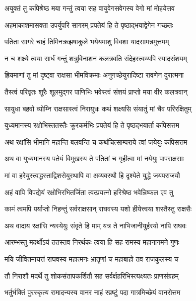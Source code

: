 \twolineshloka
{अयुक्तं तु कपिश्रेष्ठ मया गन्तुं त्वया सह}
{वायुवेगसवेगस्य वेगो मां मोहयेत्तव} %

\twolineshloka
{अहमाकाशमासक्ता उपर्युपरि सागरम्}
{प्रपतेयं हि ते पृष्ठाद्भयाद्वेगेन गच्छतः} %

\twolineshloka
{पतिता सागरे चाहं तिमिनक्रझषाकुले}
{भयेयमाशु विवशा यादसामन्नमुत्तमम्} %

\twolineshloka
{न च शक्ष्ये त्वया सार्धं गन्तुं शत्रुविनाशन}
{कलत्रवति संदेहस्त्वय्यपि स्यादसंशयम्} %

\twolineshloka
{ह्रियमाणां तु मां दृष्ट्वा राक्षसा भीमविक्रमाः}
{अनुगच्छेयुरादिष्टा रावणेन दुरात्मना} %

\twolineshloka
{तैस्त्वं परिवृतः शूरैः शूलमुद्गर पाणिभिः}
{भवेस्त्वं संशयं प्राप्तो मया वीर कलत्रवान्} %

\twolineshloka
{सायुधा बहवो व्योम्नि राक्षसास्त्वं निरायुधः}
{कथं शक्ष्यसि संयातुं मां चैव परिरक्षितुम्} %

\twolineshloka
{युध्यमानस्य रक्षोभिस्ततस्तैः क्रूरकर्मभिः}
{प्रपतेयं हि ते पृष्ठद्भयार्ता कपिसत्तम} %

\twolineshloka
{अथ रक्षांसि भीमानि महान्ति बलवन्ति च}
{कथंचित्साम्पराये त्वां जयेयुः कपिसत्तम} %

\twolineshloka
{अथ वा युध्यमानस्य पतेयं विमुखस्य ते}
{पतितां च गृहीत्वा मां नयेयुः पापराक्षसाः} %

\twolineshloka
{मां वा हरेयुस्त्वद्धस्ताद्विशसेयुरथापि वा}
{अव्यवस्थौ हि दृश्येते युद्धे जयपराजयौ} %

\twolineshloka
{अहं वापि विपद्येयं रक्षोभिरभितर्जिता}
{त्वत्प्रयत्नो हरिश्रेष्ठ भवेन्निष्फल एव तु} %

\twolineshloka
{कामं त्वमपि पर्याप्तो निहन्तुं सर्वराक्षसान्}
{राघवस्य यशो हीयेत्त्वया शस्तैस्तु राक्षसैः} %

\twolineshloka
{अथ वादाय रक्षांसि न्यस्येयुः संवृते हि माम्}
{यत्र ते नाभिजानीयुर्हरयो नापि राघवः} %

\twolineshloka
{आरम्भस्तु मदर्थोऽयं ततस्तव निरर्थकः}
{त्वया हि सह रामस्य महानागमने गुणः} %

\twolineshloka
{मयि जीवितमायत्तं राघवस्य महात्मनः}
{भ्रातॄणां च महाबाहो तव राजकुलस्य च} %

\twolineshloka
{तौ निराशौ मदर्थे तु शोकसंतापकर्शितौ}
{सह सर्वर्क्षहरिभिस्त्यक्ष्यतः प्राणसंग्रहम्} %

\twolineshloka
{भर्तुर्भक्तिं पुरस्कृत्य रामादन्यस्य वानर}
{नाहं स्प्रष्टुं पदा गात्रमिच्छेयं वानरोत्तम} %

